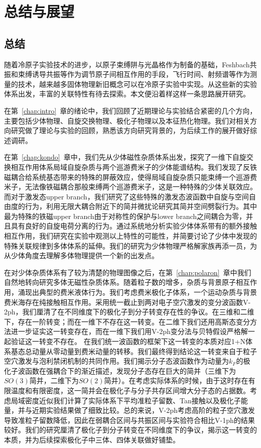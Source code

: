 \chapter{总结与展望}\label{chap:sum}

\section{总结}
随着冷原子实验技术的进步，以原子束缚阱与光晶格作为制备的基础，Feshbach共振和束缚诱导共振等作为调节原子间相互作用的手段，飞行时间、射频谱等作为测量的技术，越来越多固体物理新旧概念可以在冷原子实验中实现。从这些新的实验体系出发，丰富的关联特性有待去探索。本文便沿着样这样一条思路展开研究。

在第~\ref{chap:intro}~章的绪论中，我们回顾了近期理论与实验结合紧密的几个方向，主要包括少体物理、自旋交换物理、极化子物理以及本征热化物理。我们对相关方向研究做了理论与实验的回顾，熟悉该方向研究背景的，为后续工作的展开做好综述调研。

在第~\ref{chap:kondo}~章中，我们先从少体磁性杂质体系出发，探究了一维下自旋交换相互作用体系局域自旋杂质与两个巡游费米子的少体能谱结构。我们发现了反铁磁耦合给系统基态带来的特殊的屏蔽效应，使得局域自旋杂质只能束缚一个巡游费米子，无法像铁磁耦合那般束缚两个巡游费米子，这是一种特殊的少体关联效应。而对于激发态upper branch，我们研究了这些特殊的激发态波函数中自旋与空间自由度的行为，利用无限大耦合附近下的简并微扰论研究其简并空间劈裂行为。其中最为特殊的铁磁upper branch由于对称性的保护与lower branch之间耦合为零，并且具有良好的自旋电荷分离的行为。通过系统地分析实验少体体系带有的额外接触相互作用，我们研究在实验中观测以上特性的可能性，并简要讨论了少体中发现的特殊关联规律到多体体系的延伸。我们的研究为少体物理严格解家族再添一员，为从少体角度去理解多体物理提供一个新的出发点。

在对少体杂质体系有了较为清楚的物理图像之后，在第~\ref{chap:polaron}~章中我们自然地转向研究多体无磁性杂质体系。随着粒子数的增多，杂质与背景原子相互作用，涌现出典型的费米液体行为。我们考虑费米极化子体系，一个运动杂质与背景费米海存在纯接触相互作用。采用统一截止到两对电子空穴激发的变分波函数V-2ph，我们厘清了在不同维度下的极化子到分子转变存在性的争议。在三维和二维下，存在一阶转变；而在一维下不存在这一转变。在二维下我们还用高斯态变分方法进一步证实这一转变存在，而在一维下我们用V-2ph变分法与贝特假设严格解一起验证这一转变不存在。 在我们统一波函数的框架下这一转变的本质对应1+N体系基态总动量从零动量到费米动量的转移。我们最终得到结论这一转变来自于粒子空穴激发与泡利禁闭机制的共同作用。我们揭示分子态波函数作为动量为$k_F$的极化子波函数在强耦合下的渐近描述，发现分子态存在巨大的简并（三维下为$SO(3)$简并，二维下为$SO(2)简并$）。在考虑实际体系的时候，由于这时存在有限温度和有限密度，这一简并会在极化子与分子共存区间增大分子态的占据数。考虑局域密度近似我们计算了实际体系下平均准粒子留数、Tan接触以及极化子能量，并与近期实验结果做了细致比较。总的来说，V-2ph考虑高阶的粒子空穴激发导致准粒子留数降低，因此在弱耦合区间与共振区间与实验符合相比V-1ph的结果较好。我们的研究厘清了极化子到分子转变在不同维度下的争议，揭示这一转变的本质，并为后续探索极化子中三体、四体关联做好铺垫。


